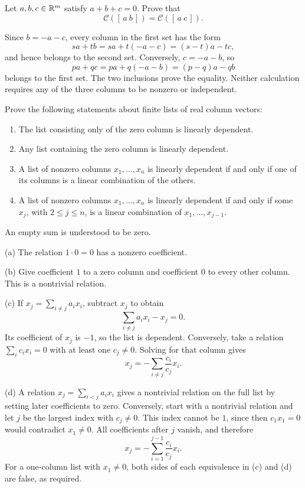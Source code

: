 \begin{problem}\label{ex:01:same-column-set}
Let $a,b,c\in\mathbb R^m$ satisfy $a+b+c=0$.
Prove that
\[
\mathcal C([\,a\ b\,])=\mathcal C([\,a\ c\,]).
\]
\end{problem}
\begin{solution}
Since $b=-a-c$, every column in the first set has the form
\[
sa+tb=sa+t(-a-c)=(s-t)a-tc,
\]
and hence belongs to the second set.
Conversely, $c=-a-b$, so
\[
pa+qc=pa+q(-a-b)=(p-q)a-qb
\]
belongs to the first set. The two inclusions prove the equality.
Neither calculation requires any of the three columns to be nonzero
or independent.
\end{solution}

\begin{problem}\label{ex:01:dependence-relations}
Prove the following statements about finite lists of real column vectors:
\begin{enumerate}
\item The list consisting only of the zero column is linearly dependent.
\item Any list containing the zero column is linearly dependent.
\item A list of nonzero columns $x_1,\ldots,x_n$ is linearly dependent
if and only if one of its columns is a linear combination of the others.
\item A list of nonzero columns $x_1,\ldots,x_n$ is linearly dependent
if and only if some $x_j$, with $2\leqslant j\leqslant n$, is a linear
combination of $x_1,\ldots,x_{j-1}$.
\end{enumerate}
An empty sum is understood to be zero.
\end{problem}
\begin{solution}
(a) The relation $1\cdot0=0$ has a nonzero coefficient.

(b) Give coefficient $1$ to a zero column and coefficient $0$ to every
other column. This is a nontrivial relation.

(c) If $x_j=\sum_{i\ne j}a_ix_i$, subtract $x_j$ to obtain
\[
\sum_{i\ne j}a_ix_i-x_j=0.
\]
Its coefficient of $x_j$ is $-1$, so the list is dependent.
Conversely, take a relation $\sum_i c_ix_i=0$ with at least one
$c_j\ne0$. Solving for that column gives
\[
x_j=-\sum_{i\ne j}\frac{c_i}{c_j}x_i.
\]

(d) A relation $x_j=\sum_{i<j}a_ix_i$ gives a nontrivial relation on
the full list by setting later coefficients to zero.
Conversely, start with a nontrivial relation and let $j$ be the
largest index with $c_j\ne0$. This index cannot be $1$, since then
$c_1x_1=0$ would contradict $x_1\ne0$. All coefficients after $j$
vanish, and therefore
\[
x_j=-\sum_{i=1}^{j-1}\frac{c_i}{c_j}x_i.
\]
For a one-column list with $x_1\ne0$, both sides of each equivalence
in (c) and (d) are false, as required.
\end{solution}

